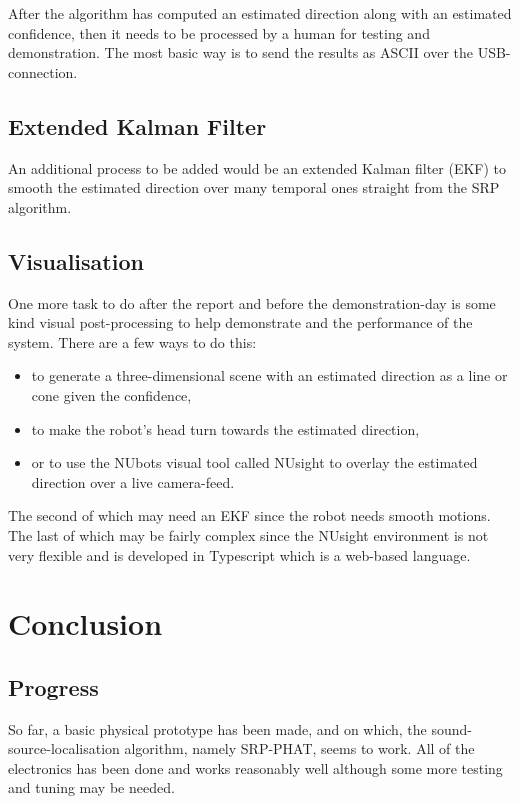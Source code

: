 \documentclass[notitlepage]{report}
\begin{document}
After the algorithm has computed an estimated direction along with an estimated confidence, then it needs to be processed by a human for testing and demonstration. The most basic way is to send the results as ASCII over the USB-connection.

\section{Extended Kalman Filter}

An additional process to be added would be an extended Kalman filter (EKF) to smooth the estimated direction over many temporal ones straight from the SRP algorithm.

\section{Visualisation}

One more task to do after the report and before the demonstration-day is some kind visual post-processing to help demonstrate and the performance of the system. There are a few ways to do this:
\begin{itemize}
	\item to generate a three-dimensional scene with an estimated direction as a line or cone given the confidence,
	\item to make the robot's head turn towards the estimated direction,
	\item or to use the NUbots visual tool called NUsight to overlay the estimated direction over a live camera-feed.
\end{itemize}

The second of which may need an EKF since the robot needs smooth motions. The last of which may be fairly complex since the NUsight environment is not very flexible and is developed in Typescript which is a web-based language.

\chapter{Conclusion}

\section{Progress}

So far, a basic physical prototype has been made, and on which, the sound-source-localisation algorithm, namely SRP-PHAT, seems to work. All of the electronics has been done and works reasonably well although some more testing and tuning may be needed.
\end{document}

